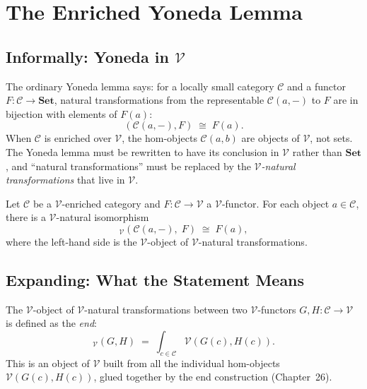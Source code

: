 \section{The Enriched Yoneda Lemma}
\label{sec:enriched-yoneda}

\subsection{Informally: Yoneda in $\mathcal{V}$}

The ordinary Yoneda lemma says: for a locally small category $\mathcal{C}$ and
a functor $F : \mathcal{C} \to \mathbf{Set}$, natural transformations from the
representable $\mathcal{C}(a, -)$ to $F$ are in bijection with elements of $F(a)$:
\begin{equation*}
  [\mathcal{C}, \mathbf{Set}](\mathcal{C}(a,-), F) \;\cong\; F(a).
\end{equation*}
When $\mathcal{C}$ is enriched over $\mathcal{V}$, the hom-objects $\mathcal{C}(a,b)$
are objects of $\mathcal{V}$, not sets. The Yoneda lemma must be rewritten to
have its conclusion in $\mathcal{V}$ rather than $\mathbf{Set}$, and
``natural transformations'' must be replaced by the \emph{$\mathcal{V}$-natural
transformations} that live in $\mathcal{V}$.

\begin{theorem}
\label{thm:enriched-yoneda}
Let $\mathcal{C}$ be a $\mathcal{V}$-enriched category and $F : \mathcal{C}
\to \mathcal{V}$ a $\mathcal{V}$-functor. For each object $a \in \mathcal{C}$,
there is a $\mathcal{V}$-natural isomorphism
\begin{equation*}
  [\mathcal{C}, \mathcal{V}]_\mathcal{V}(\mathcal{C}(a,-),\; F)
  \;\cong\;
  F(a),
\end{equation*}
where the left-hand side is the $\mathcal{V}$-object of $\mathcal{V}$-natural
transformations.
\end{theorem}

\subsection{Expanding: What the Statement Means}

The $\mathcal{V}$-object of $\mathcal{V}$-natural transformations between two
$\mathcal{V}$-functors $G, H : \mathcal{C} \to \mathcal{V}$ is defined as the
\emph{end}:
\begin{equation*}
  [\mathcal{C}, \mathcal{V}]_\mathcal{V}(G, H)
  \;=\;
  \int_{c \in \mathcal{C}} \mathcal{V}(G(c), H(c)).
\end{equation*}
This is an object of $\mathcal{V}$ built from all the individual hom-objects
$\mathcal{V}(G(c), H(c))$, glued together by the end construction (Chapter~26).

